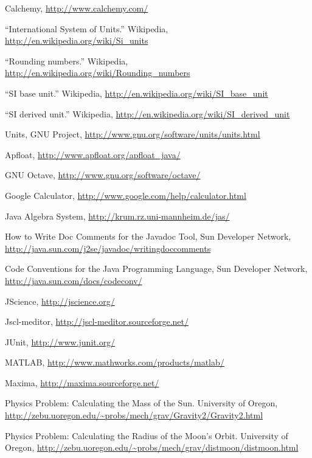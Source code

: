 \begin{thebibliography}{99}

 Calchemy, \url{http://www.calchemy.com/}

 ``International System of Units.''  Wikipedia,
  \url{http://en.wikipedia.org/wiki/Si_units}

 ``Rounding numbers.''  Wikipedia,
  \url{http://en.wikipedia.org/wiki/Rounding_numbers}

 ``SI base unit.''  Wikipedia,
  \url{http://en.wikipedia.org/wiki/SI_base_unit}

 ``SI derived unit.''  Wikipedia,
  \url{http://en.wikipedia.org/wiki/SI_derived_unit}

 Units, GNU Project,
  \url{http://www.gnu.org/software/units/units.html}

 Apfloat, \url{http://www.apfloat.org/apfloat_java/}

 GNU Octave, \url{http://www.gnu.org/software/octave/}

 Google Calculator, \url{http://www.google.com/help/calculator.html}

 Java Algebra System, \url{http://krum.rz.uni-mannheim.de/jas/}

 How to Write Doc Comments for the Javadoc Tool, Sun
  Developer Network,
  \url{http://java.sun.com/j2se/javadoc/writingdoccomments}

 Code Conventions for the Java Programming
Language, Sun Developer Network, \url{http://java.sun.com/docs/codeconv/}

 JScience,  \url{http://jscience.org/}

 Jscl-meditor, \url{http://jscl-meditor.sourceforge.net/}

 JUnit, \url{http://www.junit.org/}

 MATLAB, \url{http://www.mathworks.com/products/matlab/}

 Maxima, \url{http://maxima.sourceforge.net/}

 Physics Problem: Calculating the Mass of the Sun.
  University of Oregon,
  \url{http://zebu.uoregon.edu/~probs/mech/grav/Gravity2/Gravity2.html}

 Physics Problem: Calculating the Radius of the Moon's Orbit.
  University of Oregon,
  \url{http://zebu.uoregon.edu/~probs/mech/grav/distmoon/distmoon.html}


\end{thebibliography}
